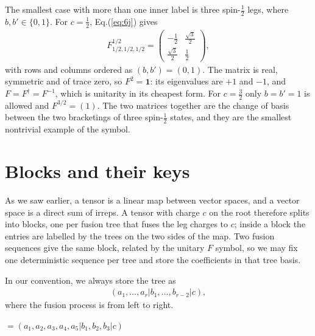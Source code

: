 \begin{example}
The smallest case with more than one inner label is three spin-$\tfrac12$ legs, where $b,b'\in\{0,1\}$. For $c=\tfrac12$, Eq.(\ref{eq:6j}) gives
\begin{align}
    F^{1/2}_{1/2,1/2,1/2}=\begin{pmatrix}
    -\tfrac12 & \tfrac{\sqrt3}{2}\\[2pt]
    \tfrac{\sqrt3}{2} & \tfrac12
    \end{pmatrix},
\end{align}
with rows and columns ordered as $(b,b')=(0,1)$. The matrix is real, symmetric and of trace zero, so $F^2=\mathbf{1}$: its eigenvalues are $+1$ and $-1$, and $F=F^\dagger=F^{-1}$, which is unitarity in its cheapest form. For $c=\tfrac32$ only $b=b'=1$ is allowed and $F^{3/2}=(1)$. The two matrices together are the change of basis between the two bracketings of three spin-$\tfrac12$ states, and they are the smallest nontrivial example of the symbol.
\end{example}

\section{Blocks and their keys}
As we saw earlier, a tensor is a linear map between vector spaces, and a vector space is a direct sum of irreps. A tensor with charge $c$ on the root therefore splits into blocks, one per fusion tree that fuses the leg charges to $c$; inside a block the entries are labelled by the trees on the two sides of the map. Two fusion sequences give the same block, related by the unitary $F$ symbol, so we may fix one deterministic sequence per tree and store the coefficients in that tree basis. 

In our convention, we always store the tree as\begin{align}
    (a_1,\dots,a_r|b_1,\dots,b_{r-2}|c),
\end{align}
where the fusion process is from left to right. 

\begin{center}
    \qquad $=(a_1,a_2,a_3,a_4,a_5|b_1,b_2,b_3|c)$
\end{center}

